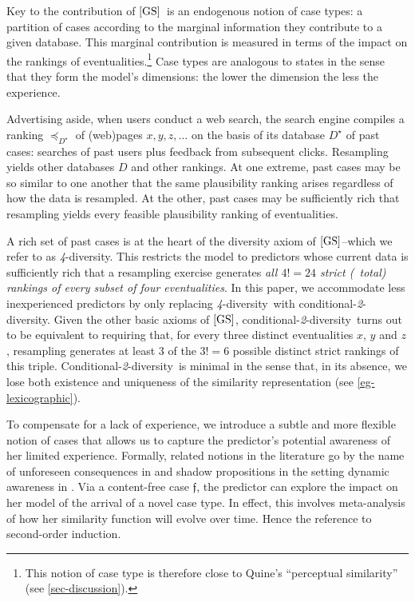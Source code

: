 \documentclass[12pt,a4paper,twoside]{article}
\newcommand{\gsii}{$\textup{[GS]}$}
\newcommand{\novel}{\mathfrak f}
\newcommand{\preceqb}{\mathbin{\preceq}}
\newcommand{\condtwodiv}{\textup{conditional-\textit{2}-diversity}}
\newcommand{\Condtwodiv}{\textup{Conditional-\textit{2}-diversity}}
\newcommand{\fourdiv}{\textit{4}-\textup{diversity}}
\begin{document}
Key to the contribution of \gsii\ is an endogenous notion of case types: a
partition of cases according to the marginal information they contribute to a
given database. This marginal contribution is measured in terms of the impact on
the rankings of eventualities.\footnote{This notion of case type is therefore
  close to Quine's ``perceptual similarity'' (see \cref{sec-discussion}).}  Case
types are analogous to states in the sense that they form the model's
dimensions: the lower the dimension the less the experience.

\begin{example}\label{eg-search_engine}
  Advertising aside, when users conduct a web search, the search engine compiles
  a ranking $\preceqb_{D^{\star}}$ of (web)pages $x, y, z, \dots$ on the basis
  of its database $D^{\star }$ of past cases: searches of past users plus
  feedback from subsequent clicks.  Resampling yields other databases $D$ and
  other rankings.  At one extreme, past cases may be so similar to one another
  that the same plausibility ranking arises regardless of how the data is
  resampled.  At the other, past cases may be sufficiently rich that resampling
  yields every feasible plausibility ranking of eventualities.
\end{example}

A rich set of past cases is at the heart of the diversity axiom of \gsii--which
we refer to as \fourdiv. This restricts the model to predictors whose current
data is sufficiently rich that a resampling exercise generates \emph{all
  $4!=24 $ strict (\ie\ total) rankings of every subset of four
  eventualities}. In this paper, we accommodate less inexperienced predictors by
only replacing \fourdiv\ with \condtwodiv. Given the other basic axioms of
\gsii, \condtwodiv\ turns out to be equivalent to requiring that, for every
three distinct eventualities $x$, $y$ and $z$, resampling generates at least $3$
of the $3! = 6$ possible distinct strict rankings of this triple. \Condtwodiv\
is minimal in the sense that, in its absence, we lose both existence and
uniqueness of the similarity representation (see \cref{eg-lexicographic}).  

To compensate for a lack of experience, we introduce a subtle and more flexible
notion of cases that allows us to capture the predictor's potential awareness of
her limited experience.  Formally, related notions in the literature go by the
name of unforeseen consequences in \citet{GQ-Surprises} and shadow propositions
in the setting dynamic awareness in \citet{HP-Dynamic_awareness}. Via a
content-free case $\novel $, the predictor can explore the impact on her model
of the arrival of a novel case type. In effect, this involves meta-analysis of
how her similarity function will evolve over time. Hence the reference to
second-order induction.
\end{document}

